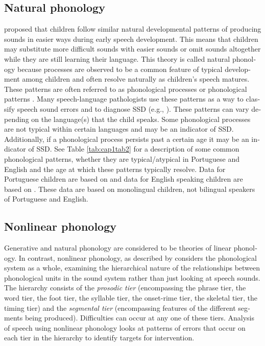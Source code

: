 \documentclass[output=paper,colorlinks,citecolor=brown]{langscibook}
\begin{document}
\begin{otherlanguage}{english}
\clearpage

\subsection*{Natural phonology}
\citet{Stampe1979a} proposed that children follow similar natural developmental patterns of producing sounds in easier ways during early speech development. This means that children may substitute more difficult sounds with easier sounds or omit sounds altogether while they are still learning their language. This theory is called natural phonology because processes are observed to be a common feature of typical development among children and often resolve naturally as children’s speech matures. These patterns are often referred to as phonological processes or phonological patterns \citep{Bowen2011, Hodson2007}. Many speech-language pathologists use these patterns as a way to classify speech sound errors and to diagnose SSD (e.g., \citealp{Hodson2007}). These patterns can vary depending on the language(s) that the child speaks. Some phonological processes are not typical within certain languages and may be an indicator of SSD. Additionally, if a phonological process persists past a certain age it may be an indicator of SSD. See Table \ref{tab:cap1tab2} for a description of some common phonological patterns, whether they are typical/atypical in Portuguese and English and the age at which these patterns typically resolve. Data for Portuguese children are based on \citet{Jesus2015} and data for English speaking children are based on \citet{Bowen2011}. These data are based on monolingual children, not bilingual speakers of Portuguese and English.




\subsection*{Nonlinear phonology}
Generative and natural phonology are considered to be theories of linear phonology. In contrast, nonlinear phonology, as described by \citet{Bernhardt2000} considers the phonological system as a whole, examining the hierarchical nature of the relationships between phonological units in the sound system rather than just looking at speech sounds. The hierarchy consists of the \emph{prosodic tier} (encompassing the phrase tier, the word tier, the foot tier, the syllable tier, the onset-rime tier, the skeletal tier, the timing tier) and the \emph{segmental tier} (encompassing features of the different segments being produced). Difficulties can occur at any one of these tiers. Analysis of speech using nonlinear phonology looks at patterns of errors that occur on each tier in the hierarchy to identify targets for intervention.


\end{otherlanguage}
\end{document}
